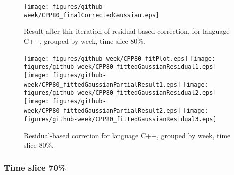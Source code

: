 \begin{figure}[]
\centering
{\texttt{[image: figures/github-week/CPP80\_finalCorrectedGaussian.eps]}}
\caption{Result after thir iteration of residual-based correction, for language C++, grouped by week, time slice 80\%.}
\end{figure}


\begin{figure}[hb]
\centering
{}
{\texttt{[image: figures/github-week/CPP80\_fitPlot.eps]}}
{\texttt{[image: figures/github-week/CPP80\_fittedGaussianResidual1.eps]}}
{\texttt{[image: figures/github-week/CPP80\_fittedGaussianPartialResult1.eps]}}
{\texttt{[image: figures/github-week/CPP80\_fittedGaussianResidual2.eps]}}
{\texttt{[image: figures/github-week/CPP80\_fittedGaussianPartialResult2.eps]}}
{\texttt{[image: figures/github-week/CPP80\_fittedGaussianResidual3.eps]}}
\caption{Residual-based corretion for language C++, grouped by week, time slice 80\%.}
\end{figure}


\clearpage 
\newpage 


\FloatBarrier

\subsubsection{Time slice 70\%}

